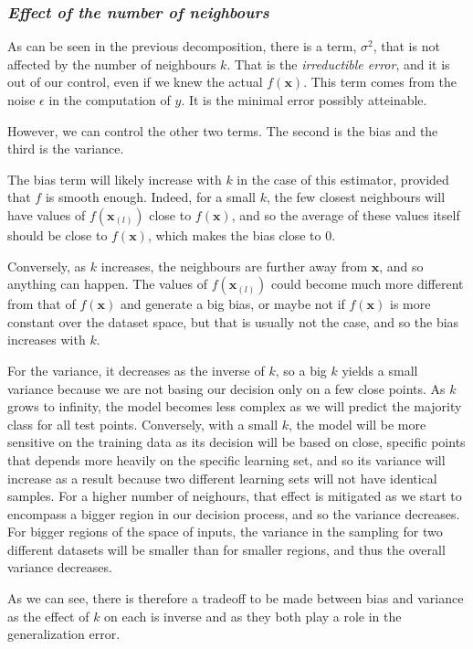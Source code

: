 \subsubsection{{\it Effect of the number of neighbours}}
As can be seen in the previous decomposition, there is a term, $\sigma^2$, that is not affected by the number of neighbours $k$. That is the \textit{irreductible error}, and it is out of our control, even if we knew the actual $f(\mathbf{x})$. This term comes from the noise $\epsilon$ in the computation of $y$. It is the minimal error possibly atteinable.\par
However, we can control the other two terms. The second is the bias and the third is the variance.\par
The bias term will likely increase with $k$ in the case of this estimator, provided that $f$ is smooth enough. Indeed, for a small $k$, the few closest neighbours will have values of $f(\mathbf{x}_{(l)})$ close to $f(\mathbf{x})$, and so the average of these values itself should be close to $f(\mathbf{x})$, which makes the bias close to $0$.\par
Conversely, as $k$ increases, the neighbours are further away from $\mathbf{x}$, and so anything can happen. The values of $f(\mathbf{x}_{(l)})$ could become much more different from that of $f(\mathbf{x})$ and generate a big bias, or maybe not if $f(\mathbf{x})$ is more constant over the dataset space, but that is usually not the case, and so the bias increases with $k$.\par
For the variance, it decreases as the inverse of $k$, so a big $k$ yields a small variance because we are not basing our decision only on a few close points. As $k$ grows to infinity, the model becomes less complex as we will predict the majority class for all test points. Conversely, with a small $k$, the model will be more sensitive on the training data as its decision will be based on close, specific points that depends more heavily on the specific learning set, and so its variance will increase as a result because two different learning sets will not have identical samples. For a higher number of neighours, that effect is mitigated as we start to encompass a bigger region in our decision process, and so the variance decreases. For bigger regions of the space of inputs, the variance in the sampling for two different datasets will be smaller than for smaller regions, and thus the overall variance decreases.\par
As we can see, there is therefore a tradeoff to be made between bias and variance as the effect of $k$ on each is inverse and as they both play a role in the generalization error.
